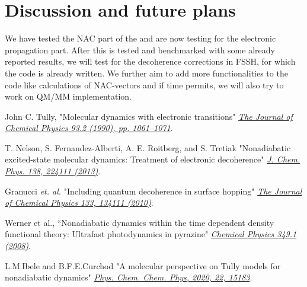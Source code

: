 \documentclass[12pt]{article}
\begin{document}
\section{Discussion and future plans}
We have tested the NAC part of the and are now testing for the electronic propagation part. After this is tested and benchmarked with some already reported results\cite{werner,curchod}, we will test for the decoherence corrections in FSSH, for which the code is already written. We further aim to add more functionalities to the code like calculations of NAC-vectors and if time permits, we will also try to work on QM/MM implementation. 


\begin{thebibliography}{9}
John C. Tully, "Molecular dynamics with electronic transitions"
\textit{\href{http://dx.doi.org/10.1039/A801824C}{The Journal
of Chemical Physics 93.2 (1990), pp. 1061–1071}}. 

T. Nelson, S. Fernandez-Alberti, A. E. Roitberg, and S. Tretiak "Nonadiabatic excited-state molecular dynamics: Treatment of electronic decoherence"
\textit{\href{https://doi.org/10.1063/1.4809568}{J. Chem. Phys. 138, 224111 (2013)}}.

Granucci \textit{et. al. }"Including quantum decoherence in surface hopping"
\textit{\href{https://doi.org/10.1063/1.3489004}{The Journal of Chemical Physics 133, 134111 (2010)}}.

Werner et al., “Nonadiabatic dynamics within the time dependent density functional theory: Ultrafast photodynamics in pyrazine"  
\textit{\href{https://doi.org/https://doi.org/10.1016/j.chemphys.2008.02.061}{Chemical Physics 349.1 (2008)}}.

L.M.Ibele and B.F.E.Curchod "A molecular perspective on Tully models for nonadiabatic dynamics"
\textit{\href{https://doi.org/10.1039/D0CP01353F}{Phys. Chem. Chem. Phys, 2020, 22, 15183}}.


\end{thebibliography}
\end{document}
